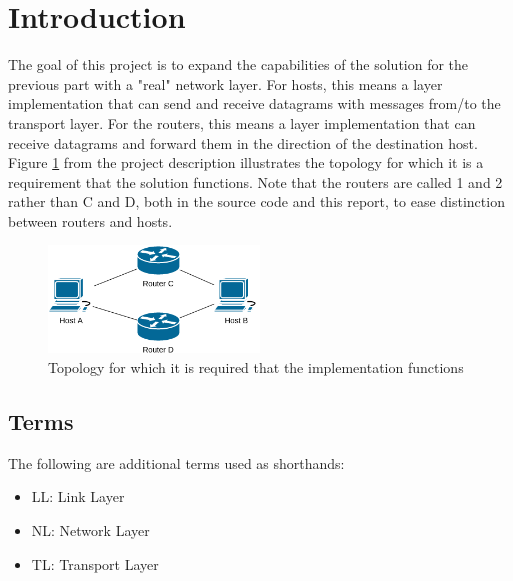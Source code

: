 \section{Introduction}

The goal of this project is to expand the capabilities of the solution for the previous part with a "real" network layer. For hosts, this means a layer implementation that can send and receive datagrams with messages from/to the transport layer. For the routers, this means a layer implementation that can receive datagrams and forward them in the direction of the destination host.\\
Figure \ref{fig:GivenTopology} from the project description illustrates the topology for which it is a requirement that the solution functions. Note that the routers are called 1 and 2 rather than C and D, both in the source code and this report, to ease distinction between routers and hosts.

\begin{figure}[H]
\centering
\includegraphics[width=0.5\textwidth]{../figs/network-topology.png}
\caption{Topology for which it is required that the implementation functions}
\label{fig:GivenTopology}
\end{figure}



\subsection{Terms}
The following are additional terms used as shorthands:
\begin{itemize}
\item LL: Link Layer
\item NL: Network Layer
\item TL: Transport Layer
\end{itemize}
